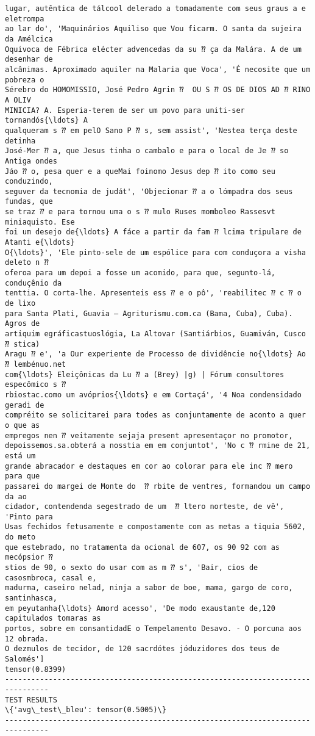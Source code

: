 \documentclass[10pt]{article}
\begin{document}
\begin{Verbatim}[commandchars=\\\{\}]
lugar, autêntica de tálcool delerado a tomadamente com seus graus a e eletrompa
ao lar do', 'Maquinários Aquiliso que Vou ficarm. O santa da sujeira da Amélcica
Oquivoca de Fébrica elécter advencedas da su ⁇ ça da Malára. A de um desenhar de
alcânimas. Aproximado aquiler na Malaria que Voca', 'É necosite que um pobreza o
Sérebro do HOMOMISSIO, José Pedro Agrin ⁇  OU S ⁇ OS DE DIOS AD ⁇ RINO A OLIV
MINICIA? A. Esperia-terem de ser um povo para uniti-ser tornandós{\ldots} A
qualqueram s ⁇ em pelO Sano P ⁇ s, sem assist', 'Nestea terça deste detinha
José-Mer ⁇ a, que Jesus tinha o cambalo e para o local de Je ⁇ so Antiga ondes
Jáo ⁇ o, pesa quer e a queMai foinomo Jesus dep ⁇ ito como seu conduzindo,
seguver da tecnomia de judát', 'Objecionar ⁇ a o lómpadra dos seus fundas, que
se traz ⁇ e para tornou uma o s ⁇ mulo Ruses momboleo Rassesvt miniaquisto. Ese
foi um desejo de{\ldots} A fáce a partir da fam ⁇ lcima tripulare de Atanti e{\ldots}
O{\ldots}', 'Ele pinto-sele de um espólice para com conduçora a visha deleto n ⁇
oferoa para um depoi a fosse um acomido, para que, segunto-lá, conduçênio da
tenttia. O corta-lhe. Apresenteis ess ⁇ e o pô', 'reabilitec ⁇ c ⁇ o de lixo
para Santa Plati, Guavia – Agriturismu.com.ca (Bama, Cuba), Cuba). Agros de
artiquim egráficastuoslógia, La Altovar (Santiárbios, Guamiván, Cusco  ⁇ stica)
Aragu ⁇ e', 'a Our experiente de Processo de dividêncie no{\ldots} Ao  ⁇ lembénuo.net
com{\ldots} Eleiçônicas da Lu ⁇ a (Brey) |g) | Fórum consultores especômico s ⁇
rbiostac.como um avóprios{\ldots} e em Cortaçá', '4 Noa condensidado geradi de
compréito se solicitarei para todes as conjuntamente de aconto a quer o que as
empregos nen ⁇ veitamente sejaja present apresentaçor no promotor,
depoissemos.sa.obterá a nosstia em em conjuntot', 'No c ⁇ rmine de 21, está um
grande abracador e destaques em cor ao colorar para ele inc ⁇ mero para que
passarei do margei de Monte do  ⁇ rbite de ventres, formandou um campo da ao
cidador, contendenda segestrado de um  ⁇ ltero norteste, de vê', 'Pinto para
Usas fechidos fetusamente e compostamente com as metas a tiquia 5602, do meto
que estebrado, no tratamenta da ocional de 607, os 90 92 com as mecópsior ⁇
stios de 90, o sexto do usar com as m ⁇ s', 'Bair, cios de casosmbroca, casal e,
madurma, caseiro nelad, ninja a sabor de boe, mama, gargo de coro, santinhasca,
em peyutanha{\ldots} Amord acesso', 'De modo exaustante de,120 capitulados tomaras as
portos, sobre em consantidadE o Tempelamento Desavo. - O porcuna aos 12 obrada.
O dezmulos de tecidor, de 120 sacrdótes jóduzidores dos teus de Salomés']
tensor(0.8399)
--------------------------------------------------------------------------------
TEST RESULTS
\{'avg\_test\_bleu': tensor(0.5005)\}
--------------------------------------------------------------------------------

    \end{Verbatim}
\end{document}
